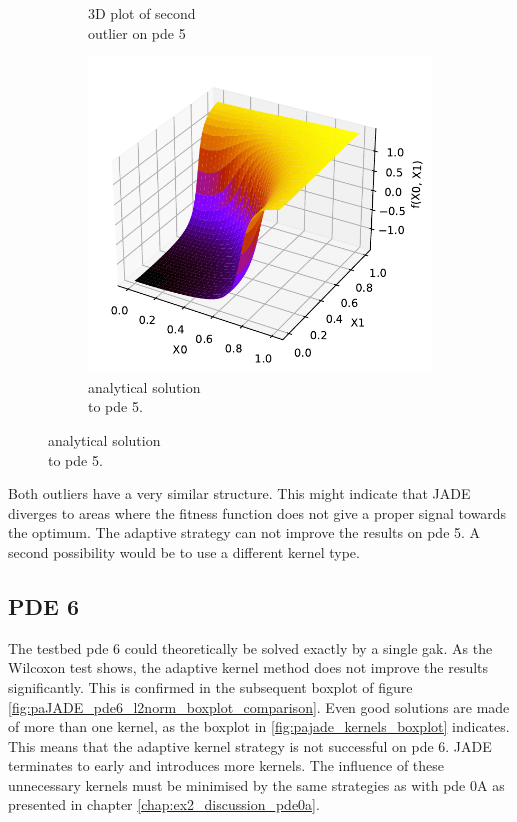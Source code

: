 \documentclass[./\jobname.tex]{subfiles}
\begin{document}
\begin{figure}[H]
\begin{subfigure}[b]{0.3333\linewidth}
		\caption{3D plot of second \\outlier on \gls{pde} 5}
		\label{fig:paJADE_pde5_outlier1}
	\end{subfigure}%
	\begin{subfigure}[b]{0.3333\linewidth}
		\centering
		\includegraphics[width=1\textwidth]{../../code/testbed/pde5/sol_pde_5.pdf}
		\caption{analytical solution \\to \gls{pde} 5.}
		\label{fig:pde5_analytical_solution_2}
	\end{subfigure}%
	\label{fig:paJADE_pde5_3D_plot_outlier}
\end{figure}

Both outliers have a very similar structure. This might indicate that JADE diverges to areas where the fitness function does not give a proper signal towards the optimum. The adaptive strategy can not improve the results on \gls{pde} 5. A second possibility would be to use a different kernel type. 


\subsection{PDE 6}

The testbed \gls{pde} 6 could theoretically be solved exactly by a single \gls{gak}. As the Wilcoxon test shows, the adaptive kernel method does not improve the results significantly. This is confirmed in the subsequent boxplot of figure \ref{fig:paJADE_pde6_l2norm_boxplot_comparison}. Even good solutions are made of more than one kernel, as the boxplot in \ref{fig:pajade_kernels_boxplot} indicates. This means that the adaptive kernel strategy is not successful on \gls{pde} 6. JADE terminates to early and introduces more kernels. The influence of these unnecessary kernels must be minimised by the same strategies as with \gls{pde} 0A as presented in chapter \ref{chap:ex2_discussion_pde0a}.
\end{document}
